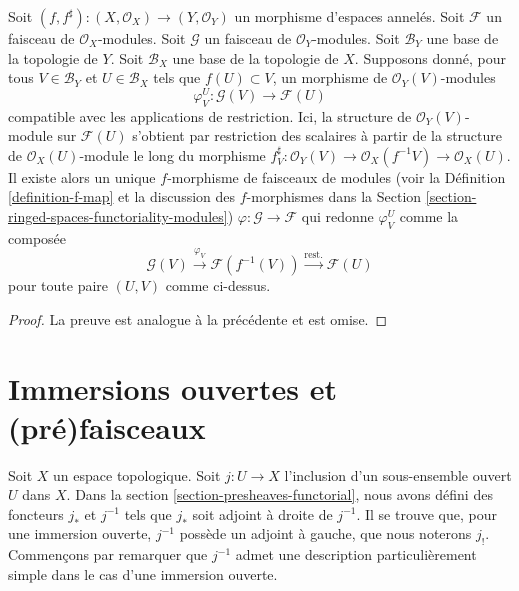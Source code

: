 \begin{lemma}
\label{lemma-f-map-basis-above-and-below-modules}
Soit $(f, f^\sharp) : (X, \mathcal{O}_X) \to (Y, \mathcal{O}_Y)$
un morphisme d'espaces annelés.
Soit $\mathcal{F}$ un faisceau de $\mathcal{O}_X$-modules.
Soit $\mathcal{G}$ un faisceau de $\mathcal{O}_Y$-modules.
Soit $\mathcal{B}_Y$ une base de la topologie de $Y$.
Soit $\mathcal{B}_X$ une base de la topologie de $X$.
Supposons donné, pour tous $V \in \mathcal{B}_Y$ et
$U \in \mathcal{B}_X$ tels que $f(U) \subset V$, un
morphisme de $\mathcal{O}_Y(V)$-modules
$$
\varphi_V^U :
\mathcal{G}(V)
\longrightarrow
\mathcal{F}(U)
$$
compatible avec les applications de restriction. Ici, la
structure de $\mathcal{O}_Y(V)$-module sur $\mathcal{F}(U)$
s'obtient par restriction des scalaires à partir de la structure de $\mathcal{O}_X(U)$-module
le long du morphisme $f^\sharp_V : \mathcal{O}_Y(V)
\to \mathcal{O}_X(f^{-1}V) \to \mathcal{O}_X(U)$.
Il existe alors un unique $f$-morphisme de faisceaux de modules (voir
la Définition \ref{definition-f-map} et la discussion
des $f$-morphismes dans la Section \ref{section-ringed-spaces-functoriality-modules})
$\varphi : \mathcal{G} \to \mathcal{F}$
qui redonne $\varphi_V^U$ comme la composée
$$
\mathcal{G}(V) \xrightarrow{\varphi_V}
\mathcal{F}(f^{-1}(V)) \xrightarrow{\text{rest.}}
\mathcal{F}(U)
$$
pour toute paire $(U, V)$ comme ci-dessus.
\end{lemma}

\begin{proof}
La preuve est analogue à la précédente et est omise.
\end{proof}

\section{Immersions ouvertes et (pré)faisceaux}
\label{section-open-immersions}

\noindent
Soit $X$ un espace topologique.
Soit $j : U \to X$ l'inclusion d'un sous-ensemble ouvert $U$ dans $X$.
Dans la section \ref{section-presheaves-functorial}, nous avons défini
des foncteurs $j_*$ et $j^{-1}$ tels que $j_*$ soit adjoint à droite de
$j^{-1}$. Il se trouve que, pour une immersion ouverte, $j^{-1}$ possède
un adjoint à gauche, que nous noterons $j_!$. Commençons par remarquer que
$j^{-1}$ admet une description particulièrement simple dans le cas d'une
immersion ouverte.

